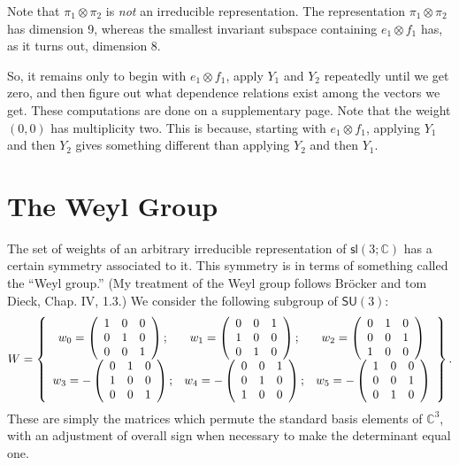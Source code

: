 \documentclass[12pt]{amsbook}
\theoremstyle{plain}
\numberwithin{equation}{chapter}
\numberwithin{theorem}{chapter}
\begin{document}
Note that $\pi_{1}\otimes\pi_{2}$ is \textit{not} an irreducible
representation. The representation $\pi_{1}\otimes\pi_{2}$ has dimension 9,
whereas the smallest invariant subspace containing $e_{1}\otimes f_{1}$ has,
as it turns out, dimension 8.

So, it remains only to begin with $e_{1}\otimes f_{1}$, apply $Y_{1}$ and
$Y_{2}$ repeatedly until we get zero, and then figure out what dependence
relations exist among the vectors we get. These computations are done on a
supplementary page. Note that the weight $\left(  0,0\right)  $ has
multiplicity two. This is because, starting with $e_{1}\otimes f_{1}$,
applying $Y_{1}$ and then $Y_{2}$ gives something different than applying
$Y_{2}$ and then $Y_{1}$.

\section{The Weyl Group}

The set of weights of an arbitrary irreducible representation of
$\mathsf{sl}\left(  3;\mathbb{C}\right)  $ has a certain symmetry associated
to it. This symmetry is in terms of something called the ``Weyl group.'' (My
treatment of the Weyl group follows Br\"ocker and tom Dieck, Chap. IV, 1.3.)
We consider the following subgroup of $\mathsf{SU}(3)$:
\[
W=\left\{
\begin{array}
[c]{ccc}%
w_{0}=\left(
\begin{array}
[c]{ccc}%
1 & 0 & 0\\
0 & 1 & 0\\
0 & 0 & 1
\end{array}
\right)  ; & w_{1}=\left(
\begin{array}
[c]{ccc}%
0 & 0 & 1\\
1 & 0 & 0\\
0 & 1 & 0
\end{array}
\right)  ; & w_{2}=\left(
\begin{array}
[c]{ccc}%
0 & 1 & 0\\
0 & 0 & 1\\
1 & 0 & 0
\end{array}
\right) \\
w_{3}=-\left(
\begin{array}
[c]{ccc}%
0 & 1 & 0\\
1 & 0 & 0\\
0 & 0 & 1
\end{array}
\right)  ; & w_{4}=-\left(
\begin{array}
[c]{ccc}%
0 & 0 & 1\\
0 & 1 & 0\\
1 & 0 & 0
\end{array}
\right)  ; & w_{5}=-\left(
\begin{array}
[c]{ccc}%
1 & 0 & 0\\
0 & 0 & 1\\
0 & 1 & 0
\end{array}
\right)
\end{array}
\right\}  \text{.}%
\]
These are simply the matrices which permute the standard basis elements of
$\mathbb{C}^{3}$, with an adjustment of overall sign when necessary to make
the determinant equal one.
\end{document}

